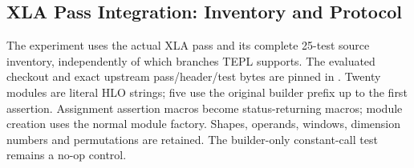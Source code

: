 \subsection{XLA Pass Integration: Inventory and Protocol}
\label{app:xla-integration}
The experiment uses the actual XLA  pass and its complete
25-test source inventory, independently of which branches TEPL supports. The
evaluated checkout and exact upstream pass/header/test bytes are pinned in
. Twenty modules are literal HLO strings;
five use the original builder prefix up to the first assertion. Assignment
assertion macros become status-returning macros; module creation uses the normal
module factory. Shapes, operands, windows, dimension numbers and permutations
are retained. The builder-only constant-call test remains a no-op control.

